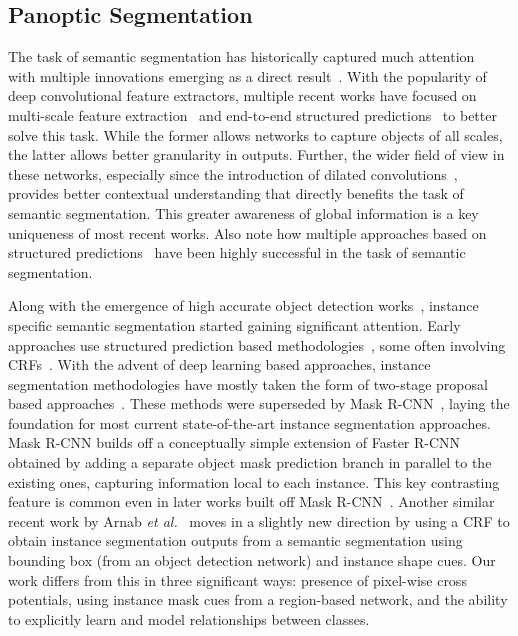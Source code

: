 \subsection{Panoptic Segmentation}

The task of semantic segmentation has historically captured much attention~\cite{semantic01, semantic02, semantic03, pasvalVOC2014} with multiple innovations emerging as a direct result~\cite{FCN_2015, Badrinarayanan2017SegNetAD, scaleAwareSemantic}. With the popularity of deep convolutional feature extractors, multiple recent works have focused on multi-scale feature extraction~\cite{Zhao2016PyramidSP, scaleAwareSemantic, dialated_conv, Yu2017DilatedRN} and end-to-end structured predictions~\cite{Zhen_ICCV15_CRFRNN, Deeplab_pami, Chen2014SemanticIS, Arnab_arxiv2015, Liu_2015_ICCV, Chen2017RethinkingAC} to better solve this task. While the former allows networks to capture objects of all scales, the latter allows better granularity in outputs. Further, the wider field of view in these networks, especially since the introduction of dilated convolutions~\cite{dialated_conv, Yu2017DilatedRN}, provides better contextual understanding that directly benefits the task of semantic segmentation. This greater awareness of global information is a key uniqueness of most recent works. Also note how multiple approaches based on structured predictions~\cite{Zhen_ICCV15_CRFRNN, Liu_2015_ICCV, Arnab_arxiv2015, refine_net} have been highly successful in the task of semantic segmentation. 

Along with the emergence of high accurate object detection works~\cite{faster_rcnn, ssd_paper}, instance specific semantic segmentation started gaining significant attention. Early approaches use structured prediction based methodologies~\cite{early_instance_seg, DPM}, some often involving CRFs~\cite{instanceCRF01, instanceCRF02}. With the advent of deep learning based approaches, instance segmentation methodologies have mostly taken the form of two-stage proposal based approaches~\cite{earlyInstance01, SelectiveSearch, earlyInstance02, instanceFCN01}. These methods were superseded by Mask R-CNN~\cite{mask_rcnn}, laying the foundation for most current state-of-the-art instance segmentation approaches. Mask R-CNN builds off a conceptually simple extension of Faster R-CNN~\cite{faster_rcnn} obtained by adding a separate object mask prediction branch in parallel to the existing ones, capturing information local to each instance. This key contrasting feature is common even in later works built off Mask R-CNN~\cite{instance_path}. Another similar recent work by Arnab \emph{et al.}~\cite{Anurag17} moves in a slightly new direction by using a CRF to obtain instance segmentation outputs from a semantic segmentation using bounding box (from an object detection network) and instance shape cues. Our work differs from this in three significant ways: presence of pixel-wise cross potentials, using instance mask cues from a region-based network, and the ability to explicitly learn and model relationships between classes. 

